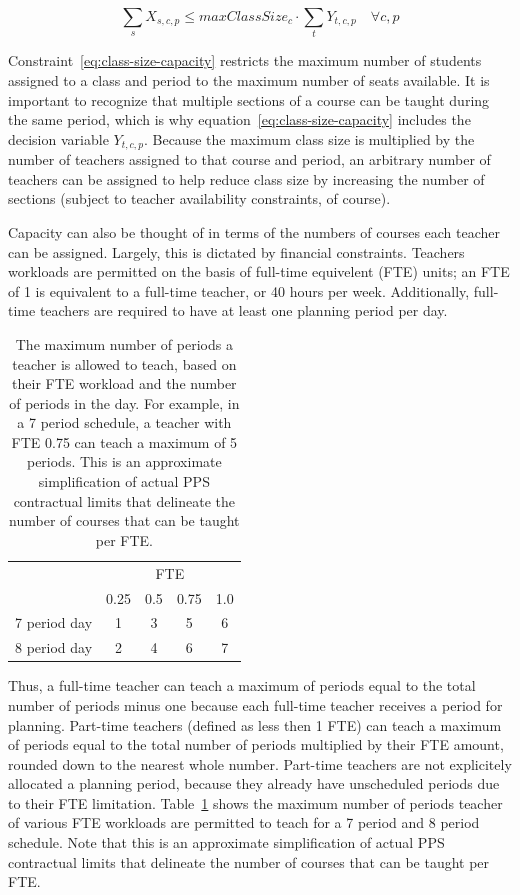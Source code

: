\documentclass[12pt]{article}
\begin{document}
\begin{equation} \label{eq:class-size-capacity}
	\displaystyle \sum_{s} X_{s,c,p} \leq maxClassSize_{c} \cdot \displaystyle \sum_{t} Y_{t,c,p} \quad \forall c,p
\end{equation}

Constraint~\ref{eq:class-size-capacity} restricts the maximum number of students assigned to a class and period to the maximum number of seats available. It is important to recognize that multiple sections of a course can be taught during the same period, which is why equation~\ref{eq:class-size-capacity} includes the decision variable $Y_{t,c,p}$. Because the maximum class size is multiplied by the number of teachers assigned to that course and period, an arbitrary number of teachers can be assigned to help reduce class size by increasing the number of sections (subject to teacher availability constraints, of course).

Capacity can also be thought of in terms of the numbers of courses each teacher can be assigned. Largely, this is dictated by financial constraints. Teachers workloads are permitted on the basis of full-time equivelent (FTE) units; an FTE of 1 is equivalent to a full-time teacher, or 40 hours per week. Additionally, full-time teachers are required to have at least one planning period per day.

\begin{table}[]
\centering
\caption{The maximum number of periods a teacher is allowed to teach, based on their FTE workload and the number of periods in the day. For example, in a 7 period schedule, a teacher with FTE 0.75 can teach a maximum of 5 periods. This is an approximate simplification of actual PPS contractual limits that delineate the number of courses that can be taught per FTE.}
\label{tab:max-num-periods}
\begin{tabular}{lcccc}
             & \multicolumn{4}{c}{FTE} \\ \cline{2-5} 
             & 0.25 & 0.5 & 0.75 & 1.0 \\ \cline{2-5} 
7 period day & 1    & 3   & 5    & 6   \\
8 period day & 2    & 4   & 6    & 7  
\end{tabular}
\end{table}

Thus, a full-time teacher can teach a maximum of periods equal to the total number of periods minus one because each full-time teacher receives a period for planning. Part-time teachers (defined as less then 1 FTE) can teach a maximum of periods equal to the total number of periods multiplied by their FTE amount, rounded down to the nearest whole number. Part-time teachers are not explicitely allocated a planning period, because they already have unscheduled periods due to their FTE limitation. Table~\ref{tab:max-num-periods} shows the maximum number of periods teacher of various FTE workloads are permitted to teach for a 7 period and 8 period schedule. Note that this is an approximate simplification of actual PPS contractual limits that delineate the number of courses that can be taught per FTE.
\end{document}
